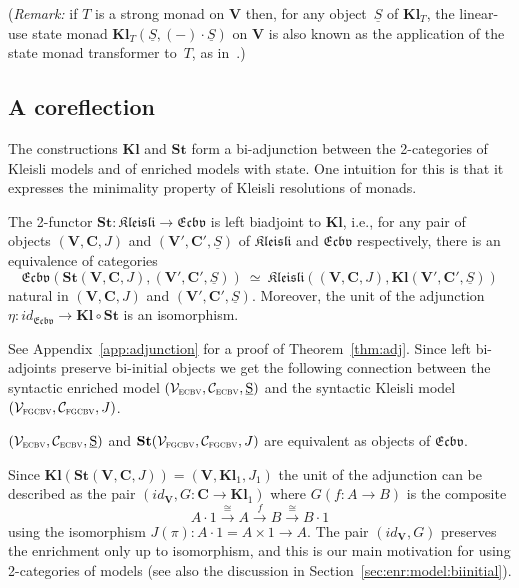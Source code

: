\documentclass{LMCS}
\newcommand{\co}{\colon}
\newcommand{\VCat}{\fixedcatfont{V}} \newcommand{\CCat}{\fixedcatfont{C}} \newcommand{\DCat}{\fixedcatfont{D}}
\newcommand{\id}{\mathit{id}}
\newcommand{\ltensor}[2]{#1 \cdot #2}
\newcommand{\fixedcatfont}{\mathbf}
\newcommand{\iso}{\cong}
\newcommand{\SA}{A}
\newcommand{\SB}{B}
\newcommand{\stateobj}{{\underline{S}}}
\newcommand{\states}{{\underline{\mathrm{S}}}}
\newcommand{\SynEnrichedModel}{(\VSynE,\CSynE, \states)}
\newcommand{\SynKlModel}{(\VSynKl,\CSynKl, J)}
\newcommand{\VSynKl}{\mathcal{V}_{\textsc{fgcbv}}}
\newcommand{\CSynKl}{\mathcal{C}_{\textsc{fgcbv}}}
\newcommand{\VSynE}{\mathcal{V}_{\textsc{ecbv}}}
\newcommand{\CSynE}{\mathcal{C}_{\textsc{ecbv}}}
\newcommand{\CATECBV}{\TwoCatFont{Ecbv}}
\newcommand{\Freyd}{\TwoCatFont{Kleisli}}
\newcommand{\FreydToECBV}{\mathbf{St}}
\newcommand{\ECBVToFreyd}{\mathbf{Kl}}
\newcommand{\KlCat}[3]{\mathbf{Kl}_{#3}} \newcommand{\Klltensor}[2]{#1 \cdot_{\mathbf{Kl}} #2}
\newcommand{\TwoCatFont}[1]{\mathfrak{#1}}
\begin{document}
(\emph{Remark:} if $T$ is a strong monad on $\VCat$
then, for any object~$\stateobj$ of $\KlCat{}{}T$, 
the linear-use state monad 
$\KlCat{}{}T(\stateobj,\ltensor{(-)}{\stateobj})$ on $\VCat$ is also known as the
application of the state monad transformer to~$T$, as in~\cite{lhj-monad-transformers}.)



\subsection{A coreflection}
\label{sec:adj}

The constructions $\ECBVToFreyd$ and $\FreydToECBV$ form a bi-adjunction
between the 2-categories of Kleisli models and of enriched models
with state. One intuition for this is that it expresses the minimality
property of Kleisli resolutions of monads.

\begin{thm} \label{thm:adj} The 2-functor $\FreydToECBV \co \Freyd
  \to \CATECBV$ is left biadjoint to $\ECBVToFreyd$, i.e., for any
  pair of objects $(\VCat, \CCat, J)$ and $(\VCat', \CCat',
  \stateobj)$ of $\Freyd$ and $\CATECBV$ respectively, there is an
  equivalence of categories
  \[\CATECBV(\FreydToECBV(\VCat, \CCat, J),(\VCat', \CCat',
  \stateobj))\ \simeq\ \Freyd((\VCat, \CCat, J),\ECBVToFreyd(\VCat',
  \CCat', \stateobj))
\]
natural in $(\VCat, \CCat, J)$  and $(\VCat', \CCat', \stateobj)$. 
Moreover, the unit of the adjunction $\eta \co \id_{\CATECBV} \to \ECBVToFreyd\circ\FreydToECBV$ is an isomorphism.
\end{thm}
See Appendix~\ref{app:adjunction} for a proof of Theorem~\ref{thm:adj}. Since left bi-adjoints preserve 
bi-initial objects we get the following
connection between the syntactic enriched model
$\SynEnrichedModel$ and the syntactic Kleisli model $\SynKlModel$.
\begin{cor} \label{cor:eq:syn:models}
$\SynEnrichedModel$ and $\FreydToECBV\SynKlModel$ are equivalent as objects of $\CATECBV$. 
\end{cor}

Since 
$\ECBVToFreyd(\FreydToECBV(\VCat, \CCat, J)) = (\VCat, \KlCat{\VCat}{\CCat}{1}, J_1)$ the unit of the adjunction 
can be described as the pair $(\id_{\VCat}, G \co \CCat \to \KlCat{\VCat}{\CCat}{1})$ where $G(f \co \SA \to \SB)$ is the composite
\[
\ltensor{\SA}{1} \xrightarrow\iso \SA \xrightarrow f \SB  \xrightarrow\iso \ltensor{\SB}{1} 
\]
using the isomorphism $J(\pi) \co \ltensor{\SA}{1} = \SA \times 1 \to \SA$.
The pair $(\id_{\VCat}, G)$ preserves the enrichment only up to isomorphism, 
and  
this is our main motivation for using 2-categories of models
(see also the discussion in Section~\ref{sec:enr:model:biinitial}).
\end{document}
